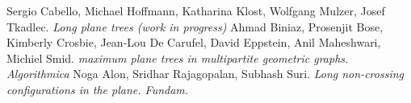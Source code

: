 \documentclass[a4paper,12pt]{article}
\begin{document}
\newpage

\begin{thebibliography}{5}
	Sergio Cabello, Michael Hoffmann, Katharina Klost, Wolfgang Mulzer, Josef Tkadlec. \textit{Long plane trees (work in progress)}
	Ahmad Biniaz, Prosenjit Bose, Kimberly Crosbie, Jean-Lou De Carufel, David Eppstein, Anil Maheshwari, Michiel Smid. \textit{maximum plane trees in multipartite geometric graphs. Algorithmica}
	Noga Alon, Sridhar Rajagopalan, Subhash Suri. \textit{Long non-crossing configurations in the plane. Fundam.}
\end{thebibliography}


	
\end{document}
